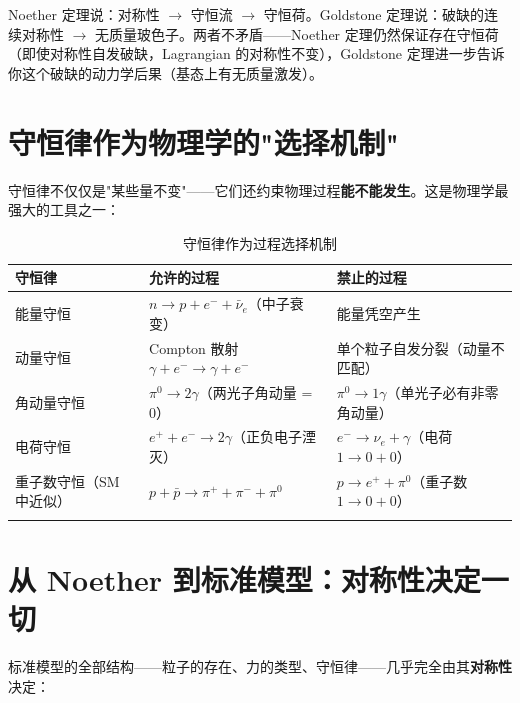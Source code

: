 
\begin{insightbox}
  Noether 定理说：对称性 $\to$ 守恒流 $\to$ 守恒荷。Goldstone 定理说：破缺的连续对称性 $\to$ 无质量玻色子。两者不矛盾——Noether 定理仍然保证存在守恒荷（即使对称性自发破缺，Lagrangian 的对称性不变），Goldstone 定理进一步告诉你这个破缺的动力学后果（基态上有无质量激发）。
\end{insightbox}

\section{守恒律作为物理学的"选择机制"}

守恒律不仅仅是"某些量不变"——它们还约束物理过程\textbf{能不能发生}。这是物理学最强大的工具之一：

\begin{center}
\footnotesize
\begin{longtable}{p{3.5cm}p{5cm}p{5.5cm}}
\toprule
\textbf{守恒律} & \textbf{允许的过程} & \textbf{禁止的过程} \\
\midrule
能量守恒 & $n \to p + e^- + \bar{\nu}_e$（中子衰变）& 能量凭空产生 \\
动量守恒 & Compton 散射 $\gamma + e^- \to \gamma + e^-$ & 单个粒子自发分裂（动量不匹配）\\
角动量守恒 & $\pi^0 \to 2\gamma$（两光子角动量 = 0）& $\pi^0 \to 1\gamma$（单光子必有非零角动量）\\
电荷守恒 & $e^+ + e^- \to 2\gamma$（正负电子湮灭）& $e^- \to \nu_e + \gamma$（电荷 $1\to0+0$）\\
重子数守恒（SM 中近似）& $p + \bar{p} \to \pi^+ + \pi^- + \pi^0$ & $p \to e^+ + \pi^0$（重子数 $1\to0+0$）\\
\bottomrule
\caption{守恒律作为过程选择机制}
\end{longtable}
\end{center}

\section{从 Noether 到标准模型：对称性决定一切}

标准模型的全部结构——粒子的存在、力的类型、守恒律——几乎完全由其\textbf{对称性}决定：

